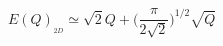 \begin{equation}
E(Q)_{_{2D}}\simeq \sqrt{2}Q+\biggl({\frac{\pi
}{2\sqrt{2}}}\biggr)^{1/2} \sqrt{Q}  \label{2}
\end{equation}

